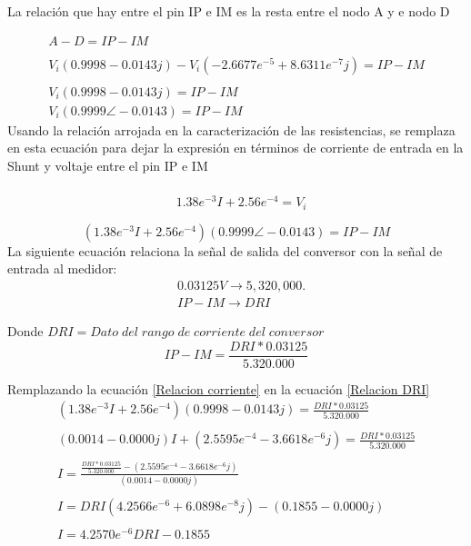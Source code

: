     La relación que hay entre el pin IP e IM es la resta entre el nodo A y e nodo D
    
    \begin{align*}
        A-D = IP-IM\\\\
        V_{i}(0.9998 - 0.0143j) - V_{i} (-2.6677e^{-5} + 8.6311e^{-7}j) = IP-IM\\\\
        V_{i}(0.9998 - 0.0143j) = IP-IM \\
        V_{i} (0.9999 \angle -0.0143) =  IP-IM
    \end{align*}
    Usando la relación arrojada en la caracterización de las resistencias, se remplaza en esta ecuación para dejar la expresión en términos de corriente de entrada en la Shunt y voltaje entre el pin IP e IM\\\\
    \begin{align*}
        &1.38e^{-3} I + 2.56e^{-4} = V_{i}\\\\
    \end{align*}
    \begin{equation}\label{Relacion corriente}
        (1.38e^{-3} I + 2.56e^{-4})(0.9999 \angle -0.0143)  = IP-IM
    \end{equation}
    La siguiente ecuación relaciona la señal de salida del conversor con la señal de entrada al medidor:\\

    \begin{align*}
        &0.03125V \rightarrow 5,320,000.\\
        &IP-IM \rightarrow DRI
    \end{align*}
    
    Donde $DRI = Dato\;del\;rango\;de\;corriente\;del\;conversor$\\
    
    \begin{equation}\label{Relacion DRI}
        IP-IM = \frac{DRI * 0.03125}{5.320.000}
    \end{equation}
    
    Remplazando la ecuación \ref{Relacion corriente} en la ecuación \ref{Relacion DRI}
    \begin{align*}
        (1.38e^{-3} I + 2.56e^{-4})(0.9998 - 0.0143j) = \frac{DRI * 0.03125}{5.320.000} \\\\
        (0.0014 - 0.0000j)I + (2.5595e^{-4} - 3.6618e^{-6}j)  = \frac{DRI * 0.03125}{5.320.000} \\\\
        I = \frac{\frac{DRI * 0.03125}{5.320.000} - (2.5595e^{-4} - 3.6618e^{-6}j)}{(0.0014 - 0.0000j)}  \\\\
        I = DRI (4.2566e^{-6} + 6.0898e^{-8}j) - (0.1855 - 0.0000j)   \\\\
        I = 4.2570e^{-6}DRI  - 0.1855   \\\\
    \end{align*}
